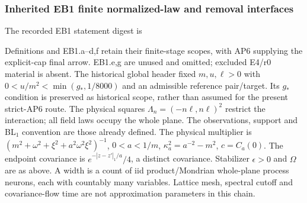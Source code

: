 \subsubsection{Inherited EB1 finite normalized-law and removal interfaces}
The recorded EB1 statement digest is
\par{}\par
Definitions and EB1.a--d,f retain their finite-stage scopes, with AP6
supplying the explicit-cap final arrow. EB1.e,g are unused and omitted;
excluded E4/r0 material is absent. The historical global header fixed
$m,u,\ell>0$ with $0<u/m^2<\min(g_*,1/8000)$ and an admissible reference
pair/target. Its $g_*$ condition is preserved as historical scope, rather
than assumed for the present strict-AP6 route. The physical squares
$\Lambda_n=(-n\ell,n\ell)^2$ restrict the interaction; all field laws
occupy the whole plane. The observations, support and BL$_1$ convention
are those already defined. The physical multiplier is
$(m^2+\omega^2+\xi^2+a^2\omega^2\xi^2)^{-1}$, $0<a<1/m$,
$\kappa_a^2=a^{-2}-m^2$, $c=C_a(0)$. The endpoint covariance is
$e^{-|z-z'|_1/a}/4$, a distinct covariance. Stabilizer $\epsilon>0$ and
$\Omega$ are as above. A width is a count of iid product/Mondrian whole-plane
process neurons, each with countably many variables. Lattice mesh,
spectral cutoff and covariance-flow time are not approximation parameters
in this chain.

